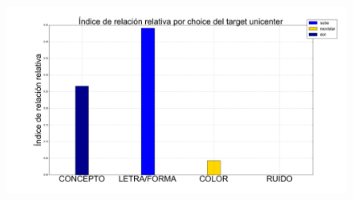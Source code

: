 \documentclass{beamer}
\begin{document}
\begin{frame}
\begin{figure}[h]
\begin{minipage}[c]{1\textwidth}
	\includegraphics[scale=0.108]{unicenter.png}
  \end{minipage}
\end{figure}
\end{frame}
\end{document}
